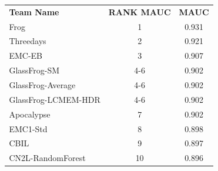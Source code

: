 \documentclass[8pt,xcolor=table,aspectratio=169]{beamer}
\begin{document}
\begin{frame}
\begin{columns}[t]
\begin{column}[t]{0.6\textwidth}
\begin{itemize}
\end{itemize}
\end{column}
\begin{column}[t]{0.4\textwidth}
 \begin{figure}
\centering
\begin{table}
\fontsize{6}{8}\selectfont
\begin{tabular}{l|c|c}
\Xhline{2.5\arrayrulewidth}
                    \textbf{Team Name} & \textbf{RANK MAUC} &   \textbf{MAUC} \\
\Xhline{2.5\arrayrulewidth}
  \rowcolor{winnerCol}   Frog &         1 &  0.931 \\
                    Threedays &         2 &  0.921 \\
                    EMC-EB &         3 &  0.907  \\
                GlassFrog-SM &       4-6 &  0.902 \\
            GlassFrog-Average &       4-6 &  0.902 \\
        GlassFrog-LCMEM-HDR &       4-6 &  0.902 \\
                    Apocalypse &         7 &  0.902 \\
                    EMC1-Std &         8 &  0.898  \\
                        CBIL &         9 &  0.897  \\
            CN2L-RandomForest &        10 &  0.896  \\




\end{tabular}
\end{table}
\end{figure}
\end{column}
\end{columns}
\end{frame}
\end{document}
